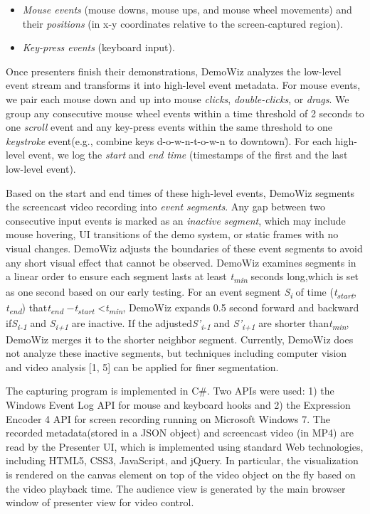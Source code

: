 \begin{itemize}
  \itemsep -2pt
  \item \textit{Mouse events} (mouse downs, mouse ups, and mouse wheel movements) and their \textit{positions} (in x-y coordinates relative to the screen-captured region).
  \item \textit{Key-press events} (keyboard input).
\end{itemize}

Once presenters finish their demonstrations, DemoWiz analyzes the low-level event stream and transforms it into high-level event metadata. For mouse events, we pair each mouse down and up into mouse \textit{clicks}, \textit{double-clicks}, or \textit{drags}. We group any consecutive mouse wheel events within a time threshold of 2 seconds to one \textit{scroll} event and any key-press events within the same threshold to one \textit{keystroke} event(e.g., combine keys d-o-w-n-t-o-w-n to \"downtown\"). For each high-level event, we log the \textit{start} and \textit{end time} (timestamps of the first and the last low-level event).

Based on the start and end times of these high-level events, DemoWiz segments the screencast video recording into \textit{event segments}. Any gap between two consecutive input events is marked as an \textit{inactive segment}, which may include mouse hovering, UI transitions of the demo system, or static frames with no visual changes. DemoWiz adjusts the boundaries of these event segments to avoid any short visual effect that cannot be observed. DemoWiz examines segments in a linear order to ensure each segment lasts at least \textit{t}\textit{\textsubscript{min}} seconds long,which is set as one second based on our early testing. For an event segment \textit{S}\textit{\textsubscript{i}} of time (\textit{t}\textit{\textsubscript{start}},\textit{ t}\textit{\textsubscript{end}}) that\textit{t}\textit{\textsubscript{end }}\textit{$-$t}\textit{\textsubscript{start}} {\textless}\textit{t}\textit{\textsubscript{min}}, DemoWiz expands 0.5 second forward and backward if\textit{S}\textit{\textsubscript{i-1}} and \textit{S}\textit{\textsubscript{i+1}} are inactive. If the adjusted\textit{S’}\textit{\textsubscript{i-1}} and \textit{S’}\textit{\textsubscript{i+1}}\textit{ }are shorter than\textit{t}\textit{\textsubscript{min}}, DemoWiz merges it to the shorter neighbor segment. Currently, DemoWiz does not analyze these inactive segments, but techniques including computer vision and video analysis [1, 5] can be applied for finer segmentation.

The capturing program is implemented in C\#. Two APIs were used: 1) the Windows Event Log API for mouse and keyboard hooks and 2) the Expression Encoder 4 API for screen recording running on Microsoft Windows 7. The recorded metadata(stored in a JSON object) and screencast video (in MP4) are read by the Presenter UI, which is implemented using standard Web technologies, including HTML5, CSS3, JavaScript, and jQuery. In particular, the visualization is rendered on the canvas element on top of the video object on the fly based on the video playback time. The audience view is generated by the main browser window of presenter view for video control.
